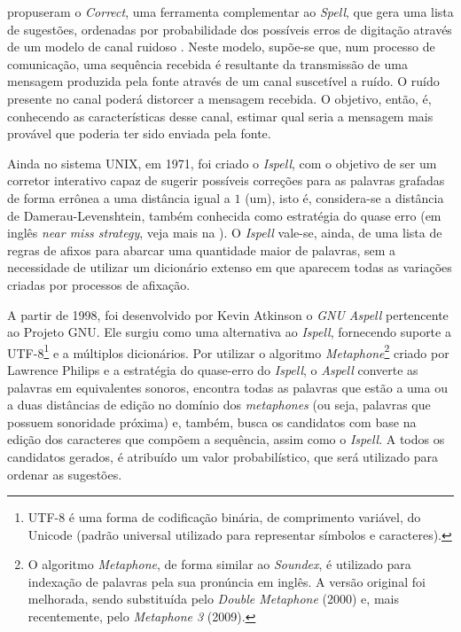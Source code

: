 \documentclass{textolivre}
\begin{document}
\textcite{church1991} propuseram o \textit{Correct}, uma ferramenta complementar ao \textit{Spell},
que gera uma lista de sugestões, ordenadas por probabilidade dos possíveis erros de digitação 
através de um modelo de canal ruidoso \cite{kernighan1990,shannon1948}. Neste modelo, supõe-se que, num processo de comunicação, uma sequência recebida é
resultante da transmissão de uma mensagem produzida pela fonte através de um canal suscetível a ruído.
O ruído presente no canal poderá distorcer a mensagem recebida. O objetivo, então, é, conhecendo 
as características desse canal, estimar qual seria a mensagem mais provável que poderia ter sido enviada pela fonte.

Ainda no sistema UNIX, em 1971, foi criado o
\textit{Ispell}, com o
objetivo de ser um corretor interativo
capaz de sugerir possíveis correções para as palavras grafadas de forma errônea \cite{ispell}
a uma distância igual a $1$ (um),
isto é, considera-se a distância de Damerau-Levenshtein,
também conhecida como estratégia do quase erro
(em inglês \textit{near miss strategy}, veja mais na ).
O \textit{Ispell} vale-se, ainda, de uma lista de
regras de afixos para abarcar uma quantidade maior 
de palavras, sem a necessidade de utilizar um dicionário extenso em que aparecem todas as variações 
criadas por processos de afixação. 

A partir de 1998, foi desenvolvido por Kevin
Atkinson o \textit{GNU Aspell} \cite{aspell} 
pertencente ao Projeto GNU. Ele surgiu como
uma alternativa ao \textit{Ispell}, fornecendo suporte a UTF-8\footnote{UTF-8 é uma forma de codificação binária, de comprimento variável, do Unicode
(padrão universal utilizado para representar símbolos e caracteres).} 
e a múltiplos dicionários.
Por utilizar o algoritmo
\textit{Metaphone}\footnote{
O algoritmo \textit{Metaphone}, de forma similar ao \textit{Soundex}, é utilizado para indexação de palavras
pela sua pronúncia em inglês. A versão original foi melhorada, sendo substituída pelo
\textit{Double Metaphone} (2000) e, mais recentemente, pelo \textit{Metaphone 3} (2009).
} 
criado por Lawrence Philips \cite{philips1990,philips2000}
e a estratégia do quase-erro do \textit{Ispell},
o \textit{Aspell} converte as palavras em equivalentes sonoros,
encontra todas as palavras que estão a uma ou a duas distâncias
de edição no domínio dos \textit{metaphones} (ou seja, palavras que possuem sonoridade próxima) e,
também, busca os candidatos com base na edição dos caracteres que compõem a sequência, assim como o \textit{Ispell}.
A todos os candidatos gerados, é atribuído
um valor probabilístico, que será utilizado para ordenar as sugestões.
 
\end{document}
